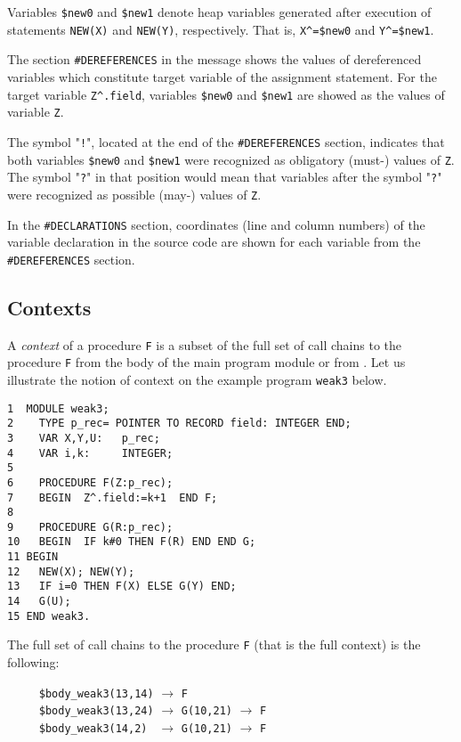 Variables \verb'$new0' and \verb'$new1' denote heap variables generated after
execution of statements \verb'NEW(X)' and \verb'NEW(Y)', respectively. 
That is, \verb'X^=$new0' and \verb'Y^=$new1'. 

The section \verb'#DEREFERENCES' in the message shows the values of
dereferenced variables which constitute target variable of the
assignment statement. For the target variable \verb'Z^.field', variables
\verb'$new0' and \verb'$new1' are showed as the values of variable \verb'Z'. 

The symbol "\verb'!'", located at the end of the \verb'#DEREFERENCES' section, 
indicates that both variables \verb'$new0' and \verb'$new1' were recognized 
as obligatory (must-) values of \verb'Z'.
The symbol "\verb'?'" in that position would mean that 
variables after the symbol "\verb'?'" were recognized 
as possible (may-) values of  \verb'Z'.

In the \verb'#DECLARATIONS' section, coordinates (line and column numbers)
of the variable declaration in the source code are shown for each variable
from the \verb'#DEREFERENCES' section.


\subsection{Contexts}

A {\em context} of a procedure \verb'F' is a subset of the full set of
call chains to the procedure \verb'F' from the body of the main program 
module or from .
Let us illustrate the notion of context 
on the example program \verb'weak3' below. 

\begin{verbatim}
1  MODULE weak3;
2    TYPE p_rec= POINTER TO RECORD field: INTEGER END;
3    VAR X,Y,U:   p_rec;
4    VAR i,k:     INTEGER; 
5 
6    PROCEDURE F(Z:p_rec);
7    BEGIN  Z^.field:=k+1  END F;
8
9    PROCEDURE G(R:p_rec);
10   BEGIN  IF k#0 THEN F(R) END END G;
11 BEGIN
12   NEW(X); NEW(Y);
13   IF i=0 THEN F(X) ELSE G(Y) END;
14   G(U);
15 END weak3.
\end{verbatim}

The full set of call chains to the procedure \verb'F' (that is the
full context) is the following: 

\verb'     $body_weak3(13,14)' $\rightarrow$ \verb'F' \\
\verb'     $body_weak3(13,24)' $\rightarrow$ \verb'G(10,21)' $\rightarrow$ \verb'F' \\
\verb'     $body_weak3(14,2) ' $\rightarrow$ \verb'G(10,21)' $\rightarrow$ \verb'F'


